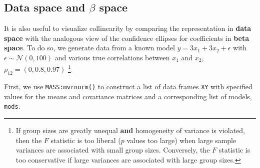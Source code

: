 \documentclass[
  letterpaper,
  10pt,
  krantz2]{krantz}
\begin{document}
\hypertarget{data-space-and-beta-space}{%
\subsection{\texorpdfstring{Data space and \(\beta\)
space}{Data space and \textbackslash beta space}}\label{data-space-and-beta-space}}

It is also useful to visualize collinearity by comparing the
representation in \textbf{data space} with the analogous view of the
confidence ellipses for coefficients in \textbf{beta space}. To do so,
we generate data from a known model \(y = 3 x_1 + 3 x_2 + \epsilon\)
with \(\epsilon \sim \mathcal{N} (0, 100)\) and various true
correlations between \(x_1\) and \(x_2\), \(\rho_{12} = (0, 0.8, 0.97)\)
\footnote{If group sizes are greatly unequal \textbf{and} homogeneity of
  variance is violated, then the \(F\) statistic is too liberal (\(p\)
  values too large) when large sample variances are associated with
  small group sizes. Conversely, the \(F\) statistic is too conservative
  if large variances are associated with large group sizes.}.


First, we use \texttt{MASS:mvrnorm()} to construct a list of data frames
\texttt{XY} with specified values for the means and covariance matrices
and a corresponding list of models, \texttt{mods}.
\end{document}
